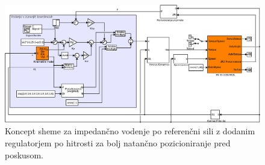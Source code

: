 \begin{figure}[!h]
	\centering
	\includegraphics[trim={0 0cm 0 0cm},scale=0.5]{./Slike/impedance_control.eps}
	\caption{Koncept \simulink sheme za impedan\v{c}no vodenje po referen\v{c}ni sili z dodanim regulatorjem po hitrosti za bolj natan\v{c}no pozicioniranje pred poskusom.}
	\label{fig:impedance_control_sim}
\end{figure}
